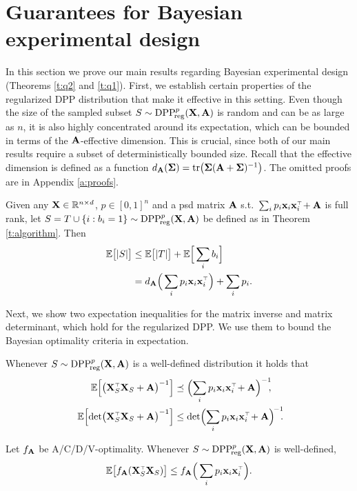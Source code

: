 \documentclass[thesis.tex]{subfiles}
\begin{document}
\section{Guarantees for Bayesian experimental design}
\label{s:guarantees}
In this section we prove our main results regarding Bayesian
experimental design (Theorems \ref{t:q2} and \ref{t:q1}). First, we
establish certain properties of the regularized DPP distribution that
make it effective in this setting. Even though the size of the
sampled subset $S\sim{{\mathrm{DPP}}_{\!\mathrm{reg}}^{p}}(\mathbf X,\mathbf A)$ is random and can be as large
as $n$, it is also highly concentrated around its expectation, which
can be bounded in terms of the $\mathbf A$-effective dimension. This is
crucial, since both of our main results require a subset of
deterministically bounded size. Recall that the effective dimension is
defined as a function $d_{\mathbf A}(\mathbf{\Sigma}) =
\mathrm{tr}\big(\mathbf{\Sigma}(\mathbf A+\mathbf{\Sigma})^{-1}\big)$. The omitted proofs are in
Appendix \ref{a:proofs}.
\begin{lemma}\label{l:size}
  Given any $\mathbf X\in\mathbb R^{n\times d}$, $p\in[0,1]^n$ and a psd matrix $\mathbf A$
s.t.~$\sum_ip_i\x_i\x_i^\top\!+\A$ is
full rank, let $S=T\cup \{i:b_i=1\}\sim {{\mathrm{DPP}}_{\!\mathrm{reg}}^{p}}(\mathbf X,\mathbf A)$ be defined
as in Theorem \ref{t:algorithm}. Then
\begin{align*}
  \E\big[|S|\big] &\leq \E\big[|T|\big] + \E\Big[\sum_i b_i\Big]  \\
                  & = d_{\A}\Big(\sum_ip_i\x_i\x_i^\top\Big) + \sum_i p_i.
\end{align*}
\end{lemma}
Next, we show two expectation inequalities for the matrix inverse and
matrix determinant, which hold for the regularized DPP.
We use them to bound the Bayesian optimality criteria in expectation.
\begin{lemma}\label{t:expectations}
Whenever $S\sim {{\mathrm{DPP}}_{\!\mathrm{reg}}^{p}}(\mathbf X,\mathbf A)$ is a well-defined distribution it holds that
\begin{align}
  \E\Big[\big(\X_S^\top\X_S+\A\big)^{-1}\Big]
  &\preceq \Big(\!
    \sum_ip_i\x_i\x_i^\top \!+\A \Big)^{-1}\!\!,\label{eq:sqinv}
  \\
\E\Big[\!\det\!\big(\X_S^\top\X_S+\A\big)^{-1}\Big]
  &\leq\det\!\Big(\!
    \sum_ip_i\x_i\x_i^\top\!+\A \Big)^{\!-1}\!\!.\!\!\label{eq:det}
\end{align}
\end{lemma}
\begin{corollary}\label{c:expectations}
Let $f_{\mathbf A}$ be A/C/D/V-optimality. Whenever $S\sim{{\mathrm{DPP}}_{\!\mathrm{reg}}^{p}}(\mathbf X,\mathbf A)$ is
well-defined,
\begin{align*}
  \E\big[f_{\A}(\X_S^\top\X_S)\big] \leq f_{\A}\Big(\sum_i p_i\x_i\x_i^\top\Big).
\end{align*}
\end{corollary}
\end{document}
